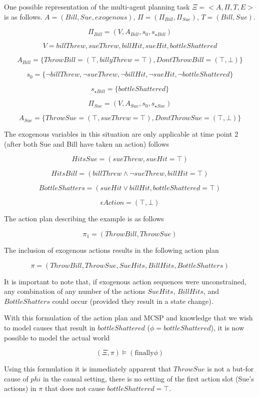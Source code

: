 \documentclass{article}
\theoremstyle{plain}
\theoremstyle{definition}
\begin{document}
One possible representation of the multi-agent planning task $\Xi=<A, \Pi, T, E>$ is as follows. $A=(Bill, Sue, exogenous)$, $\Pi=(\Pi_{Bill},\Pi_{Sue})$, $T= (Bill, Sue)$. 

\[
\Pi_{Bill}=(V, A_{Bill}, s_0, s_{\star Bill})
\]

\[
V = {billThrew, sueThrew, billHit, sueHit, bottleShattered}
\]

\[
A_{Bill}=\{ThrowBill = (\top, billyThrew = \top), {DontThrowBill=(\top, \bot)} \}
\]

\[
s_0 = \{\lnot billThrew, \lnot sueThrew, \lnot billHit, \lnot sueHit, \lnot bottleShattered \}
\]

\[ s_{\star Bill} = \{bottleShattered\} \]

\[
\Pi_{Sue}=(V, A_{Sue}, s_0, s_{\star Sue})
\]

\[
A_{Sue}=\{ThrowSue = (\top, sueThrew = \top), {DontThrowSue=(\top, \bot)} \}
\]

The exogenous variables in this situation are only applicable at time point 2 (after both Sue and Bill have taken an action) follows

\[
HitsSue = (sueThrew, sueHit = \top)
\]

\[
HitsBill = (billThrew \land \lnot sueThrew, billHit = \top)
\]

\[
BottleShatters = (sueHit \lor billHit, bottleShattered = \top)
\]

\[
\epsilon Action = (\top, \bot)
\]

The action plan describing the example is as follows

\[
\pi_1=(ThrowBill, ThrowSue)
\]

The inclusion of exogenous actions results in the following action plan

\[
\pi = (ThrowBill, ThrowSue, SueHits, BillHits, BottleShatters)
\]

It is important to note that, if exogenous action sequences were unconstrained, any combination of any number of the actions $SueHits$, $BillHits$, and $BottleShatters$ could occur (provided they result in a state change).

With this formulation of the action plan and MCSP and knowledge that we wish to model causes that result in $bottleShattered$ ($\phi=bottleShattered$), it is now possible to model the actual world 

\[
(\Xi, \pi) \models (\textrm{finally} \phi)
\]

Using this formulation it is immediately apparent that $ThrowSue$ is not a but-for cause of $phi$ in the causal setting, there is no setting of the first action slot (Sue's actions) in $\pi$ that does not cause $bottleShattered=\top$.
\end{document}
